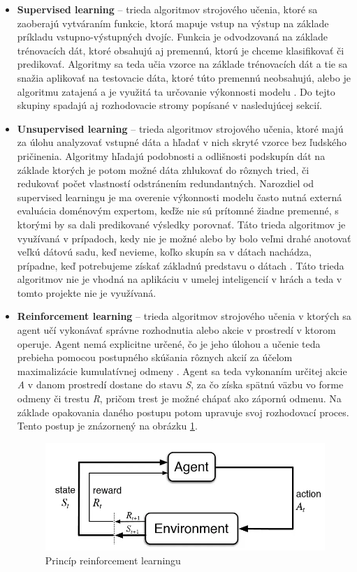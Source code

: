 \documentclass[slovak, master]{diploma}
\begin{document}
\begin{itemize}
  \item \textbf{Supervised learning} -- trieda algoritmov strojového učenia, ktoré sa zaoberajú vytváraním funkcie, ktorá mapuje vstup na výstup na základe príkladu vstupno-výstupných dvojíc. Funkcia je odvodzovaná na základe trénovacích dát, ktoré obsahujú aj premennú, ktorú je chceme klasifikovať či predikovať. Algoritmy sa teda učia vzorce na základe trénovacích dát a tie sa snažia aplikovať na testovacie dáta, ktoré túto premennú neobsahujú, alebo je algoritmu zatajená a je využitá ta určovanie výkonnosti modelu \cite{mahesh2020machine}. Do tejto skupiny spadajú aj rozhodovacie stromy popísané v nasledujúcej sekcií.
  \item \textbf{Unsupervised learning} -- trieda algoritmov strojového učenia, ktoré majú za úlohu analyzovať vstupné dáta a hľadať v nich skryté vzorce bez ľudského pričinenia. Algoritmy hľadajú podobnosti a odlišnosti podskupín dát na základe ktorých je potom možné dáta zhlukovať do rôznych tried, či redukovať počet vlastností odstránením redundantných. Narozdiel od supervised learningu je ma overenie výkonnosti modelu často nutná externá evaluácia doménovým expertom, keďže nie sú prítomné žiadne premenné, s ktorými by sa dali predikované výsledky porovnať. Táto trieda algoritmov je využívaná v prípadoch, kedy nie je možné alebo by bolo veľmi drahé anotovať veľkú dátovú sadu, keď nevieme, koľko skupín sa v dátach nachádza, prípadne, keď potrebujeme získať základnú predstavu o dátach \cite{Unsupervised}. Táto trieda algoritmov nie je vhodná na aplikáciu v umelej inteligencií v hrách a teda v tomto projekte nie je využívaná.
  \item \textbf{Reinforcement learning} -- trieda algoritmov strojového učenia v ktorých sa agent učí vykonávať správne rozhodnutia alebo akcie v prostredí v ktorom operuje. Agent nemá explicitne určené, čo je jeho úlohou a učenie teda prebieha pomocou postupného skúšania rôznych akcií za účelom maximalizácie kumulatívnej odmeny \cite{reinforcementLearning}. Agent sa teda vykonaním určitej akcie \textit{A} v danom prostredí dostane do stavu \textit{S}, za čo získa spätnú väzbu vo forme odmeny či trestu \textit{R}, pričom trest je možné chápať ako zápornú odmenu. Na základe opakovania daného postupu potom upravuje svoj rozhodovací proces. Tento postup je znázornený na obrázku \ref{pic:reinfoPic}.
  
  \begin{figure}[!htbp]
    \centering
    \includegraphics[width=.9\textwidth]{Figures/reinfoGraph.png}
    \caption{Princíp reinforcement learningu \cite{reinfoGraph}}
    \label{pic:reinfoPic}
  \end{figure}


\end{itemize}
\end{document}
